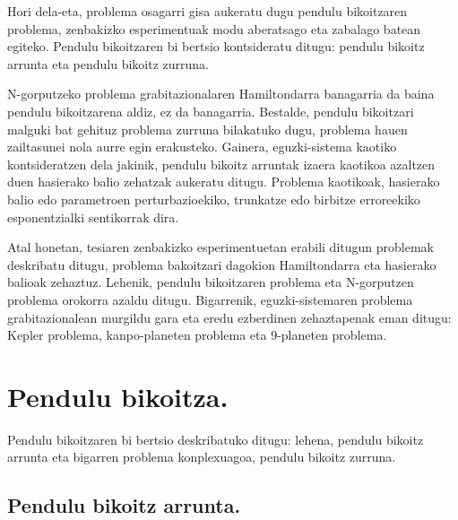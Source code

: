 Hori dela-eta, problema osagarri gisa aukeratu dugu pendulu bikoitzaren problema, zenbakizko esperimentuak modu aberatsago eta zabalago batean egiteko. Pendulu bikoitzaren bi bertsio kontsideratu ditugu: pendulu bikoitz arrunta eta pendulu bikoitz zurruna.

N-gorputzeko problema grabitazionalaren Hamiltondarra banagarria da baina pendulu bikoitzarena aldiz, ez da banagarria. Bestalde, pendulu bikoitzari malguki bat gehituz  problema zurruna bilakatuko dugu, problema hauen zailtasunei nola aurre egin erakusteko. Gainera,  eguzki-sistema kaotiko \cite{Laskar1999}  kontsideratzen dela  jakinik, pendulu bikoitz arruntak izaera kaotikoa azaltzen duen hasierako balio zehatzak aukeratu ditugu. Problema kaotikoak,  hasierako balio edo parametroen perturbazioekiko, trunkatze edo birbitze erroreekiko esponentzialki sentikorrak dira.

Atal honetan, tesiaren zenbakizko esperimentuetan erabili ditugun problemak deskribatu ditugu, problema bakoitzari dagokion Hamiltondarra eta hasierako balioak zehaztuz. Lehenik, pendulu bikoitzaren problema eta N-gorputzen problema orokorra azaldu ditugu. Bigarrenik, eguzki-sistemaren problema grabitazionalean murgildu gara eta eredu ezberdinen zehaztapenak eman ditugu: Kepler problema, kanpo-planeten problema eta 9-planeten problema. 

\section{Pendulu bikoitza.}
\label{s:32}

Pendulu bikoitzaren bi bertsio deskribatuko ditugu: lehena, pendulu bikoitz arrunta eta bigarren problema konplexuagoa, pendulu bikoitz zurruna. 

\subsection{Pendulu bikoitz arrunta.}
\label{ss:321}


